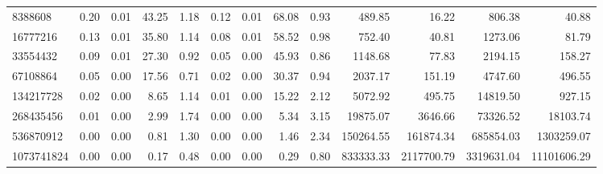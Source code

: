 \begin{tabular}{lrrrrrrrrrrrr}
8388608 & 0.20 & 0.01 & 43.25 & 1.18 & 0.12 & 0.01 & 68.08 & 0.93 & 489.85 & 16.22 & 806.38 & 40.88 \\
16777216 & 0.13 & 0.01 & 35.80 & 1.14 & 0.08 & 0.01 & 58.52 & 0.98 & 752.40 & 40.81 & 1273.06 & 81.79 \\
33554432 & 0.09 & 0.01 & 27.30 & 0.92 & 0.05 & 0.00 & 45.93 & 0.86 & 1148.68 & 77.83 & 2194.15 & 158.27 \\
67108864 & 0.05 & 0.00 & 17.56 & 0.71 & 0.02 & 0.00 & 30.37 & 0.94 & 2037.17 & 151.19 & 4747.60 & 496.55 \\
134217728 & 0.02 & 0.00 & 8.65 & 1.14 & 0.01 & 0.00 & 15.22 & 2.12 & 5072.92 & 495.75 & 14819.50 & 927.15 \\
268435456 & 0.01 & 0.00 & 2.99 & 1.74 & 0.00 & 0.00 & 5.34 & 3.15 & 19875.07 & 3646.66 & 73326.52 & 18103.74 \\
536870912 & 0.00 & 0.00 & 0.81 & 1.30 & 0.00 & 0.00 & 1.46 & 2.34 & 150264.55 & 161874.34 & 685854.03 & 1303259.07 \\
1073741824 & 0.00 & 0.00 & 0.17 & 0.48 & 0.00 & 0.00 & 0.29 & 0.80 & 833333.33 & 2117700.79 & 3319631.04 & 11101606.29 \\
\bottomrule
\end{tabular}
